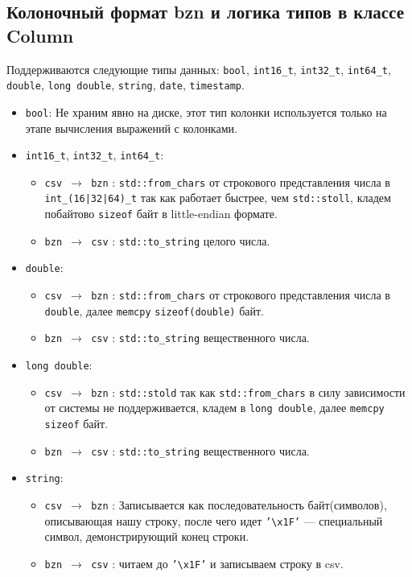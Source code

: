 \documentclass[a4paper,12pt]{extarticle}
\begin{document}
\subsection{Колоночный формат bzn и логика типов в классе Column}
Поддерживаются следующие типы данных:
\texttt{bool}, \texttt{int16\_t}, \texttt{int32\_t}, \texttt{int64\_t},
\texttt{double}, \texttt{long double}, \texttt{string}, \texttt{date}, \texttt{timestamp}.

\begin{itemize}
    \item \texttt{bool}:
  Не храним явно на диске, этот тип колонки используется только на этапе вычисления выражений с колонками.
    \item \texttt{int16\_t}, \texttt{int32\_t}, \texttt{int64\_t}:
    \begin{itemize}
        \item \texttt{csv $\rightarrow$ bzn} : \texttt{std::from\_chars} от строкового представления числа в \texttt{int\_(16|32|64)\_t} так как работает быстрее, чем \texttt{std::stoll}, кладем побайтово \texttt{sizeof} байт в little-endian формате.
        \item \texttt{bzn $\rightarrow$ csv} : \texttt{std::to\_string} целого числа.
    \end{itemize}
    \item \texttt{double}:
    \begin{itemize}
        \item \texttt{csv $\rightarrow$ bzn} : \texttt{std::from\_chars} от строкового представления числа в \texttt{double}, далее \texttt{memcpy} \texttt{sizeof(double)} байт.
        \item \texttt{bzn $\rightarrow$ csv} : \texttt{std::to\_string} вещественного числа.
    \end{itemize}
    \item \texttt{\texttt{long double}}:
    \begin{itemize}
        \item \texttt{csv $\rightarrow$ bzn} : \texttt{std::stold} так как \texttt{std::from\_chars}
        в силу зависимости от системы не поддерживается, кладем в \texttt{long double}, далее \texttt{memcpy} \texttt{sizeof} байт.
        \item \texttt{bzn $\rightarrow$ csv} : \texttt{std::to\_string} вещественного числа.
    \end{itemize}

    \item \texttt{\texttt{string}}:
    \begin{itemize}
        \item \texttt{csv $\rightarrow$ bzn} :
Записывается как последовательность байт(символов), описывающая нашу строку, после
чего идет \texttt{'\textbackslash x1F'} — специальный символ, демонстрирующий конец
строки.
        \item \texttt{bzn $\rightarrow$ csv} : читаем до \texttt{'\textbackslash x1F'} и записываем строку в csv.


\end{itemize}
\end{itemize}
\end{document}
